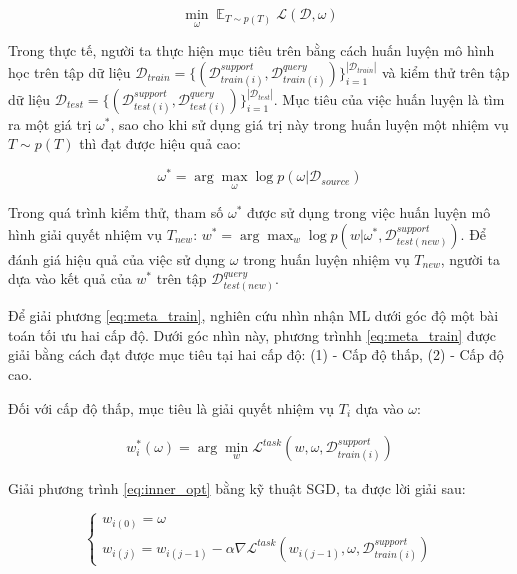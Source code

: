 \begin{equation}
    \min_{\omega} \mathop{\mathbb{E}}_{T\sim p(T)} \mathcal{L}(\mathcal{D}, \omega)
\end{equation}

Trong thực tế, người ta thực hiện mục tiêu trên bằng cách huấn luyện mô hình học trên tập dữ liệu $\mathcal{D}_{train} = \{(\mathcal{D}_{train(i)}^{support}, \mathcal{D}_{train(i)}^{query})\}_{i=1}^{|\mathcal{D}_{train}|}$ và kiểm thử trên tập dữ liệu $\mathcal{D}_{test} = \{(\mathcal{D}_{test(i)}^{support}, \mathcal{D}_{test(i)}^{query})\}_{i=1}^{|\mathcal{D}_{test}|}$. Mục tiêu của việc huấn luyện là tìm ra một giá trị $\omega^*$, sao cho khi sử dụng giá trị này trong huấn luyện một nhiệm vụ $T\sim p(T)$ thì đạt được hiệu quả cao:

\begin{dmath}
    \label{eq:meta_train}
    \omega^* = \arg \max_{\omega} \log{p(\omega|\mathcal{D}_{source})}
\end{dmath}

Trong quá trình kiểm thử, tham số $\omega^*$ được sử dụng trong việc huấn luyện mô hình giải quyết nhiệm vụ $T_{new}$: $w^* = \arg \max_{w} \log{p(w|\omega^*, \mathcal{D}_{test(new)}^{support})}$. Để đánh giá hiệu quả của việc sử dụng $\omega$ trong huấn luyện nhiệm vụ $T_{new}$, người ta dựa vào kết quả của $w^*$ trên tập $\mathcal{D}_{test(new)}^{query}$.

Để giải phương \ref{eq:meta_train}, nghiên cứu \cite{hospedales2020meta} nhìn nhận ML dưới góc độ một bài toán tối ưu hai cấp độ. Dưới góc nhìn này, phương trìnhh \ref{eq:meta_train} được giải bằng cách đạt được mục tiêu tại hai cấp độ: (1) - Cấp độ thấp, (2) - Cấp độ cao.

Đối với cấp độ thấp, mục tiêu là giải quyết nhiệm vụ $T_i$ dựa vào $\omega$:

\begin{eqnarray}
    \label{eq:inner_opt}
    w^*_i(\omega) = \arg \min_{w} \mathcal{L}^{task}(w, \omega, \mathcal{D}_{train(i)}^{support})
\end{eqnarray}

Giải phương trình \ref{eq:inner_opt} bằng kỹ thuật SGD, ta được lời giải sau:

\begin{equation}
    \label{sol:inner_opt}
    \begin{cases}
        w_{i(0)} = \omega\\
        w_{i(j)} = w_{i(j-1)} - \alpha \nabla \mathcal{L}^{task}(w_{i(j-1)}, \omega, \mathcal{D}_{train(i)}^{support})
    \end{cases}
\end{equation}

